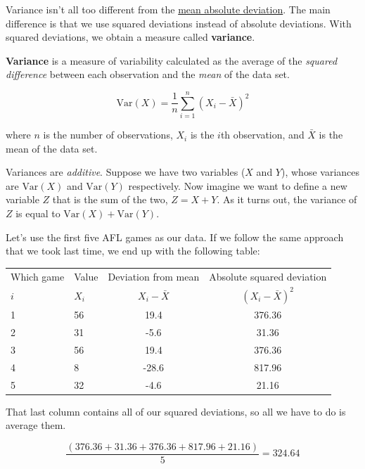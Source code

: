 \documentclass[
  11pt,
  a4paper,
  twoside,symmetric,openright]{book}
\theoremstyle{break}
\theoremstyle{break}
\begin{document}
Variance isn't all too different from the \hyperref[aad]{mean absolute deviation}. The main difference is that we use squared deviations instead of absolute deviations. With squared deviations, we obtain a measure called \textbf{variance}.

\begin{definition}[Variance]
\protect\hypertarget{def:defVar}{}\label{def:defVar}\textbf{Variance} is a measure of variability calculated as the average of the \emph{squared difference} between each observation and the \emph{mean} of the data set.

\[
\mbox{Var}(X) = \frac{1}{n} \sum_{i=1}^n (X_i - \bar{X})^2
\]

where \(n\) is the number of observations, \(X_i\) is the \(i\)th observation, and \(\bar{X}\) is the mean of the data set.
\end{definition}

Variances are \emph{additive}. Suppose we have two variables (\(X\) and \(Y\)), whose variances are \(\mbox{Var}(X)\) and \(\mbox{Var}(Y)\) respectively. Now imagine we want to define a new variable \(Z\) that is the sum of the two, \(Z = X+Y\). As it turns out, the variance of \(Z\) is equal to \(\mbox{Var}(X) + \mbox{Var}(Y)\).

\begin{example}
\protect\hypertarget{exm:exVarAddit}{}\label{exm:exVarAddit}Let's use the first five AFL games as our data. If we follow the same approach that we took last time, we end up with the following table:

\begin{table}[H]
\centering
\begin{tabular}{llcc}
\toprule
\multicolumn{1}{c}{Which game} & \multicolumn{1}{c}{Value} & \multicolumn{1}{c}{Deviation from mean} & \multicolumn{1}{c}{Absolute squared deviation} \\
\cmidrule(l{3pt}r{3pt}){1-1} \cmidrule(l{3pt}r{3pt}){2-2} \cmidrule(l{3pt}r{3pt}){3-3} \cmidrule(l{3pt}r{3pt}){4-4}
$i$ & $X_i$ & $X_i - \bar{X}$ & $(X_i - \bar{X})^2$\\
\midrule
1 & 56 & 19.4 & 376.36\\
2 & 31 & -5.6 & 31.36\\
3 & 56 & 19.4 & 376.36\\
4 & 8 & -28.6 & 817.96\\
5 & 32 & -4.6 & 21.16\\
\bottomrule
\end{tabular}
\end{table}

That last column contains all of our squared deviations, so all we have to do is average them.

\[
\frac{( 376.36 + 31.36 + 376.36 + 817.96 + 21.16 )}{5} = 324.64
\]
\end{example}
\end{document}
